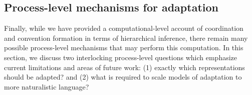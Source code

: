 


\subsection{Process-level mechanisms for adaptation}

Finally, while we have provided a computational-level account of coordination and convention formation in terms of hierarchical inference, there remain many possible process-level mechanisms that may perform this computation.
In this section, we discuss two interlocking process-level questions which emphasize current limitations and areas of future work: (1) exactly which representations should be adapted? and (2) what is required to scale models of adaptation to more naturalistic language? %

